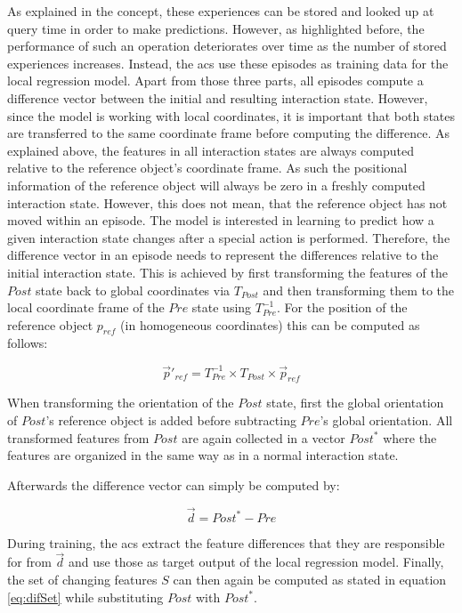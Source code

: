 As explained in the concept, these experiences can be stored and looked up at query time in order to make predictions. However, as highlighted before, the performance of such an operation deteriorates over time as the number of stored experiences increases. Instead, the \glspl{ac} use these episodes as training data for the local regression model. Apart from those three parts, all episodes compute a difference vector between the initial and resulting interaction state. 
However, since the model is working with local coordinates, it is important that both states are transferred to the same coordinate frame before computing the difference. As explained above, the features in all interaction states are always computed relative to the reference object's coordinate frame. As such the positional information of the reference object will always be zero in a freshly computed interaction state. However, this does not mean, that the reference object has not moved within an episode. The model is interested in learning to predict how a given interaction state changes after a special action is performed. Therefore, the difference vector in an episode needs to represent the differences relative to the initial interaction state. This is achieved by first transforming the features of the $Post$ state back to global coordinates via $T_{Post}$ and then transforming them to the local coordinate frame of the $Pre$ state using $T^{-1}_{Pre}$. For the position of the reference object $p_{ref}$ (in homogeneous coordinates) this can be computed as follows:

\begin{equation}
\vec{p}'_{ref} = T^{-1}_{Pre} \times T_{Post} \times \vec{p}_{ref}
\end{equation}

When transforming the orientation of the $Post$ state, first the global orientation of $Post$'s reference object is added before subtracting $Pre$'s global orientation. All transformed features from $Post$ are again collected in a vector $Post^*$ where the features are organized in the same way as in a normal interaction state.

Afterwards the difference vector can simply be computed by:

\begin{equation}
\vec{d} = Post^* - Pre
\end{equation}

During training, the \glspl{ac} extract the feature differences that they are responsible for from $\vec{d}$ and use those as target output of the local regression model.
Finally, the set of changing features $S$ can then again be computed as stated in equation \ref{eq:difSet} while substituting $Post$ with $Post^*$.

